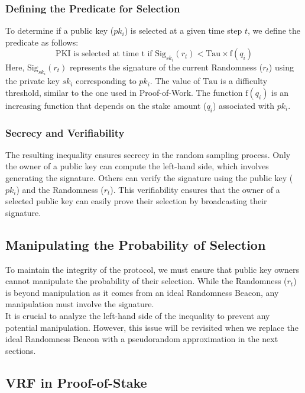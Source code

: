 \subsubsection{Defining the Predicate for Selection}
To determine if a public key ($pk_i$) is selected at a given time step $t$, we define the predicate as follows:
$$
\text{PKI is selected at time t if } \text{Sig}_{sk_i}(r_t) < \text{Tau} \times \text{f}(q_i)
$$
Here, $\text{Sig}_{sk_i}(r_t)$ represents the signature of the current Randomness ($r_t$) using the private key $sk_i$ corresponding to $pk_i$. The value of $\text{Tau}$ is a difficulty threshold, similar to the one used in Proof-of-Work. The function $\text{f}(q_i)$ is an increasing function that depends on the stake amount ($q_i$) associated with $pk_i$.

\subsubsection{Secrecy and Verifiability}
The resulting inequality ensures secrecy in the random sampling process. Only the owner of a public key can compute the left-hand side, which involves generating the signature. Others can verify the signature using the public key ($pk_i$) and the Randomness ($r_t$). This verifiability ensures that the owner of a selected public key can easily prove their selection by broadcasting their signature.

\subsection{Manipulating the Probability of Selection}
To maintain the integrity of the protocol, we must ensure that public key owners cannot manipulate the probability of their selection. While the Randomness ($r_t$) is beyond manipulation as it comes from an ideal Randomness Beacon, any manipulation must involve the signature.\\
It is crucial to analyze the left-hand side of the inequality to prevent any potential manipulation. However, this issue will be revisited when we replace the ideal Randomness Beacon with a pseudorandom approximation in the next sections.

\subsection{VRF in Proof-of-Stake}
